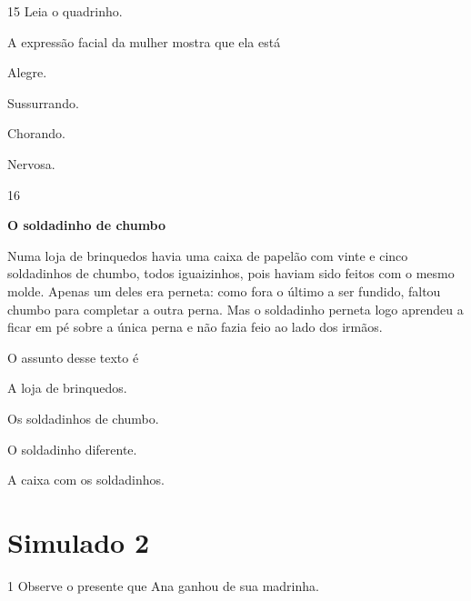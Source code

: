 \num{15} Leia o quadrinho.


A expressão facial da mulher mostra que ela está

\begin{escolha}
\item Alegre.

\item Sussurrando.

\item Chorando.

\item Nervosa.
\end{escolha}

\num{16}

\textbf{O soldadinho de chumbo}

Numa loja de brinquedos havia uma caixa de papelão com
vinte e cinco soldadinhos de chumbo, todos iguaizinhos, pois
haviam sido feitos com o mesmo molde. Apenas um deles
era perneta: como fora o último a ser fundido, faltou chumbo
para completar a outra perna. Mas o soldadinho perneta logo
aprendeu a ficar em pé sobre a única perna e não fazia feio ao
lado dos irmãos.


O assunto desse texto é

\begin{escolha}
\item A loja de brinquedos.

\item Os soldadinhos de chumbo.

\item O soldadinho diferente.

\item A caixa com os soldadinhos.
\end{escolha}


\chapter{Simulado 2}

\num{1} Observe o presente que Ana ganhou de sua madrinha.

